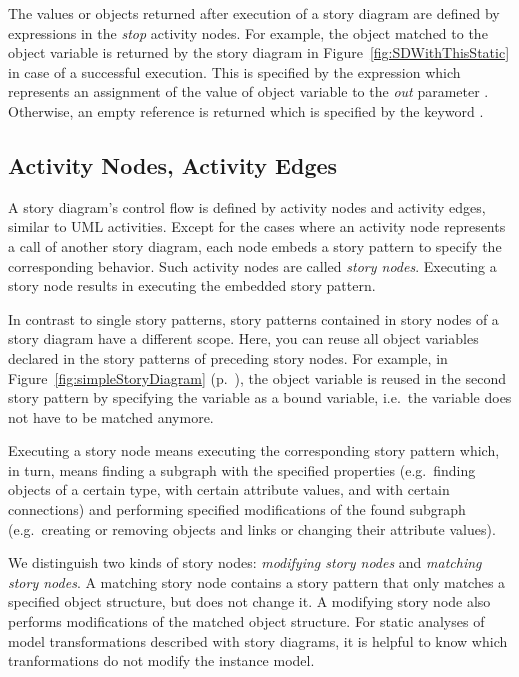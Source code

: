 The values or objects returned after execution of a story diagram are defined by expressions in the \emph{stop} activity nodes.
For example, the object matched to the object variable  is returned by the story diagram in Figure~\ref{fig:SDWithThisStatic} in case of a successful execution.
This is specified by the expression  which represents an assignment of the value of object variable  to the \emph{out} parameter .
Otherwise, an empty reference is returned which is specified by the keyword .


\subsection{Activity Nodes, Activity Edges} \label{sec:storydiagrams:activitynodes}

A story diagram's control flow is defined by activity nodes and activity edges, similar to UML activities.
Except for the cases where an activity node represents a call of another story diagram,
each node embeds a story pattern to specify the corresponding behavior.
Such activity nodes are called \emph{story nodes}.
Executing a story node results in executing the embedded story pattern.

In contrast to single story patterns, story patterns contained in story nodes of a story diagram have a different scope.
Here, you can reuse all object variables declared in the story patterns of preceding story nodes.
For example, in Figure~\ref{fig:simpleStoryDiagram} (p.~\pageref{fig:simpleStoryDiagram}),
the object variable  is reused in the second story pattern
by specifying the variable as a bound variable, i.e.\ the variable does not have to be matched anymore.

Executing a story node means executing the corresponding story pattern
which, in turn, means finding a subgraph with the specified properties
(e.g.\ finding objects of a certain type, with certain attribute values, and with certain connections)
and performing specified modifications of the found subgraph
(e.g.\ creating or removing objects and links or changing their attribute values).

We distinguish two kinds of story nodes: \emph{modifying story nodes} and \emph{matching story nodes}.
A matching story node contains a story pattern that only matches a specified object structure, but does not change it.
A modifying story node also performs modifications of the matched object structure.
For static analyses of model transformations described with story diagrams,
it is helpful to know which tranformations do not modify the instance model.


